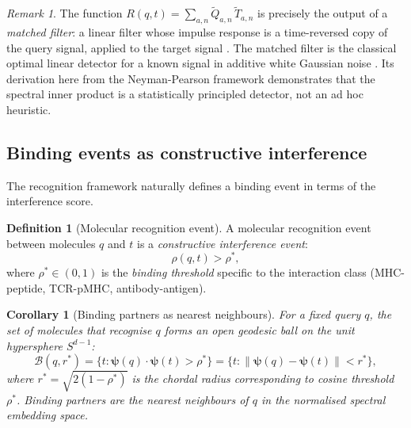 \documentclass[twocolumn,11pt,a4paper]{article}
\newtheorem{corollary}[theorem]{Corollary}
\theoremstyle{definition}
\newtheorem{definition}[theorem]{Definition}
\theoremstyle{remark}
\newtheorem{remark}[theorem]{Remark}
\newcommand{\norm}[1]{\left\| #1 \right\|}
\begin{document}
\begin{remark}
The function $R(q,t) = \sum_{a,n}\widetilde{Q}_{a,n}\,\widetilde{T}_{a,n}$
is precisely the output of a \emph{matched filter}: a linear filter whose
impulse response is a time-reversed copy of the query signal, applied to the
target signal \citep{turin1960}. The matched filter is the classical optimal
linear detector for a known signal in additive white Gaussian noise
\citep{wiener1930,kay1998}. Its derivation here from the Neyman-Pearson
framework demonstrates that the spectral inner product is a statistically
principled detector, not an ad hoc heuristic.
\end{remark}

\subsection{Binding events as constructive interference}
\label{sec:binding_events}

The recognition framework naturally defines a binding event in terms of the
interference score.

\begin{definition}[Molecular recognition event]
\label{def:binding}
A molecular recognition event between molecules $q$ and $t$ is a
\emph{constructive interference event}:
\begin{equation}
  \rho(q,t) > \rho^*,
  \label{eq:binding_condition}
\end{equation}
where $\rho^* \in (0,1)$ is the \emph{binding threshold} specific to the
interaction class (MHC-peptide, TCR-pMHC, antibody-antigen).
\end{definition}

\begin{corollary}[Binding partners as nearest neighbours]
\label{cor:ball}
For a fixed query $q$, the set of molecules that recognise $q$ forms an open
geodesic ball on the unit hypersphere $S^{d-1}$:
\begin{equation}
  \mathcal{B}(q, r^*)
  = \bigl\{t : \bm{\psi}(q)\cdot\bm{\psi}(t) > \rho^*\bigr\}
  = \bigl\{t : \norm{\bm{\psi}(q)-\bm{\psi}(t)} < r^*\bigr\},
  \label{eq:binding_ball}
\end{equation}
where $r^* = \sqrt{2(1-\rho^*)}$ is the chordal radius corresponding to
cosine threshold $\rho^*$. Binding partners are the nearest neighbours of $q$
in the normalised spectral embedding space.
\end{corollary}
\end{document}
